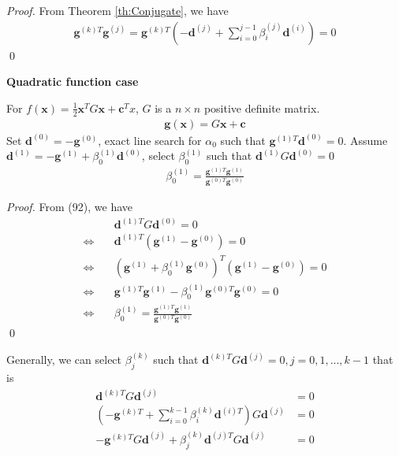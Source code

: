 \documentclass[runningheads]{llncs}
\begin{document}
\begin{proof}
    From Theorem \ref{th:Conjugate}, we have
    \begin{align}
        \mathbf{g}^{(k)T}\mathbf{g}^{(j)}
        = \mathbf{g}^{(k)T} (-\mathbf{d}^{(j)} 
        + \sum_{i=0}^{j-1}\beta_i^{(j)} \mathbf{d}^{(i)}) = 0
    \end{align}
    \qed
\end{proof}
\noindent\textbf{Quadratic function case}
\par
For $f(\mathbf{x}) = \frac{1}{2}\mathbf{x}^T G \mathbf{x} + \mathbf{c}^T x$,
$G$ is a $n \times n$ positive definite matrix.
\begin{align}
    \mathbf{g}(\mathbf{x}) = G \mathbf{x} + \mathbf{c}
\end{align}
Set $\mathbf{d}^{(0)} = -\mathbf{g}^{(0)}$,
exact line search for $\alpha_0$ such that 
$\mathbf{g}^{(1)T}\mathbf{d}^{(0)} = 0$.
Assume $\mathbf{d}^{(1)} = -\mathbf{g}^{(1)} + \beta_0^{(1)}\mathbf{d}^{(0)}$,
select $\beta_0^{(1)}$ such that
$ \mathbf{d}^{(1)} G \mathbf{d}^{(0)} = 0$
\begin{align}
    \beta_0^{(1)} = \frac{\mathbf{g}^{(1)T}\mathbf{g}^{(1)}}
    {\mathbf{g}^{(0)T}\mathbf{g}^{(0)}}
\end{align}
\begin{proof}
    From (92), we have
    \begin{align}
        &\mathbf{d}^{(1)T} G \mathbf{d}^{(0)} = 0 \\
        \Leftrightarrow \quad&\mathbf{d}^{(1)T}
        (\mathbf{g}^{(1)} - \mathbf{g}^{(0)}) = 0 \\
        \Leftrightarrow  \quad&(\mathbf{g}^{(1)} + 
        \beta_0^{(1)}\mathbf{g}^{(0)})^T
        (\mathbf{g}^{(1)} - \mathbf{g}^{(0)}) = 0 \\
        \Leftrightarrow \quad&\mathbf{g}^{(1)T}\mathbf{g}^{(1)}
        - \beta_0^{(1)}\mathbf{g}^{(0)T}\mathbf{g}^{(0)} = 0 \\
        \Leftrightarrow \quad&\beta_0^{(1)} = 
        \frac{\mathbf{g}^{(1)T}\mathbf{g}^{(1)}}
        {\mathbf{g}^{(0)T}\mathbf{g}^{(0)}}
    \end{align}
    \qed
\end{proof}
    Generally, we can select $\beta_j^{(k)}$ such that
    $\mathbf{d}^{(k)T} G \mathbf{d}^{(j)} = 0, j=0, 1,..., k-1$
    that is
    \begin{align}
        \mathbf{d}^{(k)T} G \mathbf{d}^{(j)} &= 0 \\
        (-\mathbf{g}^{(k)T} + \sum_{i=0}^{k-1} \beta_i^{(k)} \mathbf{d}^{(i)T})
        G \mathbf{d}^{(j)} &= 0 \\
        -\mathbf{g}^{(k)T} G \mathbf{d}^{(j)}
        + \beta_j^{(k)}\mathbf{d}^{(j)T} G \mathbf{d}^{(j)} &= 0
    \end{align}
\end{document}

